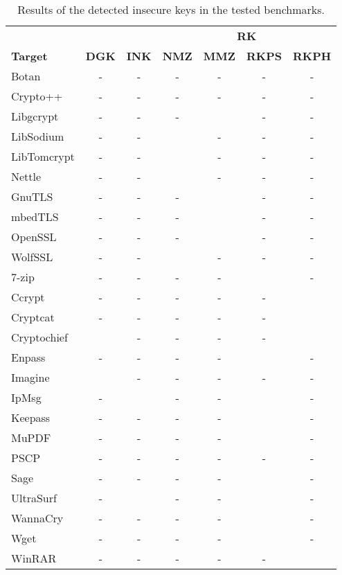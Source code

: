 \begin{table}[t]
\scriptsize
\centering

\begin{tabular}{l | c| c |c |c | c | c }
\toprule
 			&  &  & \multicolumn{4}{c}{{\bf RK}} \\
\cline{4-7}
{\bf Target}	& {\bf DGK}  & {\bf INK} & {\bf NMZ} & {\bf MMZ} & {\bf RKPS} & {\bf RKPH} \\
\hline\hline
Botan		            & -  & - & - & - & - & - \\
Crypto++            & -  & - & - & - & - & - \\
Libgcrypt		    & -  & -  & -  & \Y & -  & - \\
LibSodium		 & -  & - & \Y	& - &- & -\\ 
LibTomcrypt		& -  & - & \Y	& -	& - & -\\
Nettle			          & - & -  & \Y &  - & -  & - \\
\hline
GnuTLS			     & - & - & - & \Y 	& -  & - \\
mbedTLS			  & - & - & - & \Y 	& -  & - \\
OpenSSL			   & - & - & - & \Y & -  & - \\
WolfSSL			     & - & - & \Y & -	& -  & - \\
\hline\hline
7-zip			           & - 	& - & - & - & \Y & - \\
Ccrypt			         & - & - & - & - & - & \Y	\\
Cryptcat		       & - & - & - & -	& - & \Y	\\
Cryptochief		   & \Y	& - & - & - & - & \Y	\\
Enpass			        & -	& - & - & - & \Y & - \\
Imagine			       & \Y	& - & - & - & - & - \\
IpMsg			         & - & \Y & - & - & \Y & - \\
Keepass			     & - & - & -  & - & \Y & - \\
MuPDF			      & -	& - & - & - & \Y & - \\
PSCP		            & -  & - & - & - & - & - \\
Sage			          & - & - & - & - & \Y & - \\                                            
UltraSurf		     & - & \Y & - & - & \Y & - \\
WannaCry		  & - & - & - & - & \Y & - \\
Wget			          & - & - & - & - & \Y & - \\
WinRAR			      & - & - & - & - & - & \Y	\\
\bottomrule
\end{tabular}

\caption{Results of the detected insecure keys in the tested benchmarks.}\label{tab:insecKey}
\end{table}

